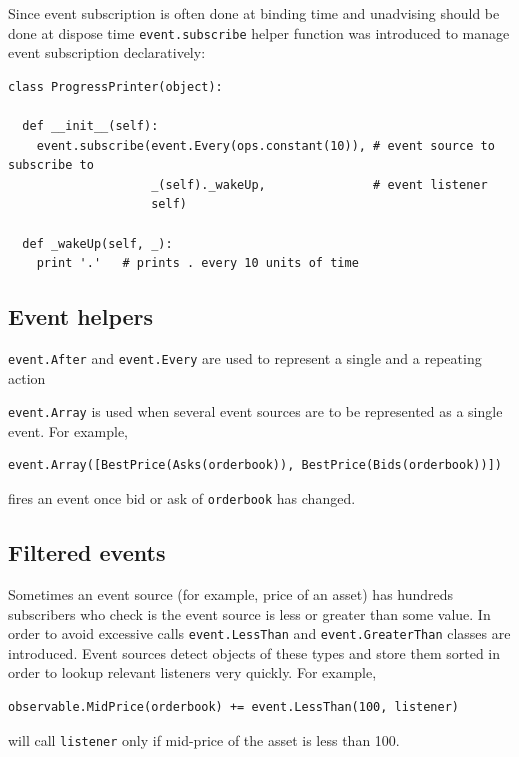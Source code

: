 \documentclass[a4paper,11pt]{article}
\begin{document}
Since event subscription is often done at binding time and unadvising
should be done at dispose time \texttt{event.subscribe} helper function
was introduced to manage event subscription declaratively:

\begin{verbatim}
class ProgressPrinter(object):

  def __init__(self):
    event.subscribe(event.Every(ops.constant(10)), # event source to subscribe to
                    _(self)._wakeUp,               # event listener
                    self)

  def _wakeUp(self, _):
    print '.'   # prints . every 10 units of time
\end{verbatim}

\subsection{Event helpers}\label{event-helpers}

\texttt{event.After} and \texttt{event.Every} are used to represent a
single and a repeating action

\texttt{event.Array} is used when several event sources are to be
represented as a single event. For example,

\begin{verbatim}
event.Array([BestPrice(Asks(orderbook)), BestPrice(Bids(orderbook))])
\end{verbatim}

fires an event once bid or ask of \texttt{orderbook} has changed.

\subsection{Filtered events}\label{filtered-events}

Sometimes an event source (for example, price of an asset) has hundreds
subscribers who check is the event source is less or greater than some
value. In order to avoid excessive calls \texttt{event.LessThan} and
\texttt{event.GreaterThan} classes are introduced. Event sources detect
objects of these types and store them sorted in order to lookup relevant
listeners very quickly. For example,

\begin{verbatim}
observable.MidPrice(orderbook) += event.LessThan(100, listener)
\end{verbatim}

will call \texttt{listener} only if mid-price of the asset is less than
100.
\end{document}
